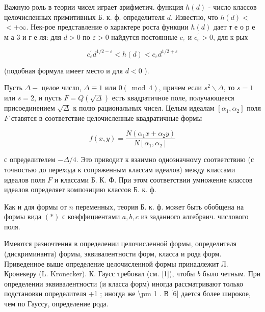 \documentclass[10pt]{article}
\begin{document}
Важную роль в теории чисел играет арифметич. функция $h(d)$ - число классов целочисленных примитивных Б. к. ф. определителя $d$. Известно, что $h(d)<$ $<+\infty$. Нек-рое представление о характере роста функции $h(d)$ дает т е о р е м а 3 и г е ля: для $d>0$ по $\varepsilon>0$ найдутся постоянные $c_{\varepsilon}$ и $c_{\varepsilon}^{\prime}>0$, для к-рых



\[

c_{\varepsilon}^{\prime} d^{1 / 2-\varepsilon}<h(d)<c_{\varepsilon} d^{1 / 2+\varepsilon}

\]



(подобная формула имеет место и для $d<0$ ).



Пусть $\Delta-$ целое число, $\Delta \equiv 1$ или $0(\bmod 4)$, причем если $s^{2} \backslash \Delta$, то $s=1$ или $s=2$, и пусть $F=Q(\sqrt{\Delta})$ есть квадратичное поле, получающееся присоединением $\sqrt{\Delta}$ к полю рациональных чисел. Целым идеалам $\left[\alpha_{1}, \alpha_{2}\right]$ поля $F$ ставятся в соответствие целочисленные квадратичные формы



\[

f(x, y)=\frac{N\left(\alpha_{1} x+\alpha_{2} y\right)}{N\left[\alpha_{1}, \alpha_{2}\right]}

\]



с определителем $-\Delta / 4$. Это приводит к взаимно однозначному соответствию (с точностью до перехода к сопряженным классам идеалов) между классами идеалов поля $F$ и классами Б. К. Ф. При этом соответствии умножение классов идеалов определяет композицию классов Б. к. ф.



Как и для формы от $n$ переменных, теория Б. к. ф. может быть обобщена на формы вида $(*)$ с коэффициентами $a, b, c$ из заданного алгебраич. числового поля.



Имеются разночтения в определении целочисленной формы, определителя (дискриминанта) формы, эквивалентности форм, класса и рода форм. Приведенное выше определение целочисленной формы принадлежит Л. Кронекеру (L. Kronecker). К. Гаусс требовал (см. [1]), чтобы $b$ было четным. При определении эквивалентности (и класса форм) иногда рассматривают только подстановки определителя +1 ; иногда же \textbackslash pm 1 . В [6] дается более широкое, чем по Гауссу, определение рода.
\end{document}
